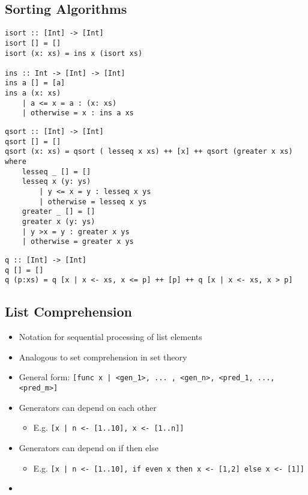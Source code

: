 \subsection{Sorting Algorithms}
\begin{itemize}
\begin{verbatim}
isort :: [Int] -> [Int]
isort [] = []
isort (x: xs) = ins x (isort xs)

ins :: Int -> [Int] -> [Int]
ins a [] = [a]
ins a (x: xs)
    | a <= x = a : (x: xs)
    | otherwise = x : ins a xs
\end{verbatim}
\begin{verbatim}
qsort :: [Int] -> [Int]
qsort [] = []
qsort (x: xs) = qsort ( lesseq x xs) ++ [x] ++ qsort (greater x xs)
where
    lesseq _ [] = []
    lesseq x (y: ys)
        | y <= x = y : lesseq x ys
        | otherwise = lesseq x ys
    greater _ [] = []
    greater x (y: ys)
    | y >x = y : greater x ys
    | otherwise = greater x ys
\end{verbatim}
\begin{verbatim}
q :: [Int] -> [Int]
q [] = []
q (p:xs) = q [x | x <- xs, x <= p] ++ [p] ++ q [x | x <- xs, x > p]
\end{verbatim}
\end{itemize}

\subsection{List Comprehension}
\begin{itemize}
    \item Notation for sequential processing of list elements
    \item Analogous to set comprehension in set theory
    \item General form: \verb+[func x | <gen_1>, ... , <gen_n>, <pred_1, ..., <pred_m>]+
    \item Generators can depend on each other
        \begin{itemize}
            \item E.g. \verb+[x | n <- [1..10], x <- [1..n]]+
        \end{itemize}
    \item Generators can depend on if then else
        \begin{itemize}
        \item E.g. \verb+[x | n <- [1..10], if even x then x <- [1,2] else x <- [1]]+
        \end{itemize}
    \item {}
\end{itemize}

